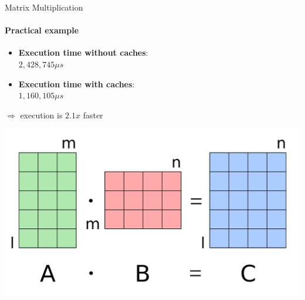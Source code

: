 \documentclass[handout,aspectratio=169]{beamer}
\begin{document}
\begin{frame}{Matrix Multiplication}
	\framesubtitle{Practical example}
	\begin{minipage}{.77\textwidth}
		\begin{itemize}
			\item \textbf{Execution time without caches}:\\ $2,428,745 \mu s$
			\item \textbf{Execution time with caches}:\\ $1,160,105 \mu s$
		\end{itemize}
		\begin{center}
			$\Rightarrow$ execution is $2.1x$ faster
		\end{center}
	\end{minipage}
	\begin{minipage}{.22\textwidth}
		\begin{center}
			\includegraphics[width=.9\textwidth]{matmul.png}
		\end{center}
	\end{minipage}
\end{frame}
\end{document}
